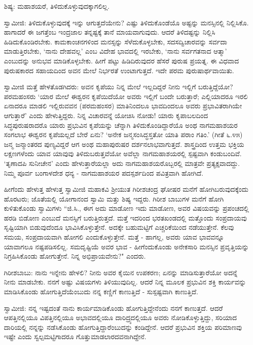 ಶಿಷ್ಯ: ಮಹಾಶಯರೆ, ತಿಳಿದುಕೊಳ್ಳುವುದಕ್ಕಾಗಲಿಲ್ಲ.

ಸ್ವಾಮೀಜಿ: ತಿಳಿದುಕೊಳ್ಳುವುದಕ್ಕೆ ಇನ್ನು ಆಗುತ್ತದೆಯೇನು? ಎಷ್ಟು ತಿಳಿದುಕೊಂಡೆಯೊ ಅಷ್ಟನ್ನು ಮನಸ್ಸಿನಲ್ಲಿ ನಿಲ್ಲಿಸಿಕೊ. ಹಾಗಾದರೆ ಈ ಜಗತ್ತೆಂಬ ಇಂದ್ರಜಾಲ ತನ್ನಷ್ಟಕ್ಕೆ ತಾನೆ ಮಾಯವಾಗುವುದು. ಆದರೆ ತಿಳಿದಷ್ಟನ್ನು ನಿಲ್ಲಿಸಿ ಹಿಡಿದುಕೊಂಡಿರಬೇಕು. ಕಾಮಕಾಂಚನಗಳಿಂದ ಮನಸ್ಸನ್ನು ಸೆಳೆದುಕೊಳ್ಳಬೇಕು, ಸದಸದ್ವಿಚಾರವನ್ನು ಸರ್ವದಾ ಮಾಡುತ್ತಿರಬೇಕು, ‘ನಾನು ದೇಹವಲ್ಲ’ ಎಂಬ ವಿದೇಹ ಭಾವದಲ್ಲಿ ಇರಬೇಕು, ‘ನಾನು ಸರ್ವಗತನಾದ ಆತ್ಮಾ’ ಎಂಬುದನ್ನು ಅನುಭವ ಮಾಡಿಕೊಳ್ಳಬೇಕು. ಹೀಗೆ ಪಟ್ಟು ಹಿಡಿದಿರುವುದರ ಹೆಸರೆ ಪುರುಷ ಪ್ರಯತ್ನ. ಈ ವಿಧವಾದ ಪುರುಷಕಾರದ ಸಹಾಯದಿಂದ ಅವನ ಮೇಲೆ ನಿರ್ಭರತೆ ಉಂಟಾಗುತ್ತದೆ. ಇದೇ ಪರಮ ಪುರುಷಾರ್ಥವಾಯಿತು.

ಸ್ವಾಮೀಜಿ ಮತ್ತೆ ಹೇಳತೊಡಗಿದರು: ಅವನ ಕೃಪೆಯು ನಿನ್ನ ಮೇಲೆ ಇಲ್ಲದಿದ್ದರೆ ನೀನು ಇಲ್ಲಿಗೆ ಬರುತ್ತಿದ್ದೆಯೋ? ಪರಮಹಂಸರು ‘ಯಾರ ಮೇಲೆ ಈಶ್ವರನ ಕೃಪೆಯಿದೆಯೋ ಅವರು ಇಲ್ಲಿಗೆ ಬಂದೇ ಬರುತ್ತಾರೆ; ಎಲ್ಲಿಯಾದರೂ ಇರಲಿ ಏನಾದರೂ ಮಾಡಲಿ ಇಲ್ಲಿರುವವನ (ಪರಮಹಂಸರ) ಮಾತಿನಿಂದಲೂ ಭಾವದಿಂದಲೂ ಅವರು ಪ್ರಭಾವಿತರಾಗಿಯೇ ಆಗುತ್ತಾರೆ’ ಎಂದು ಹೇಳುತ್ತಿದ್ದರು. ನಿನ್ನ ವಿಚಾರವನ್ನೆ ಯೋಚಿಸಿ ನೋಡು! ಯಾರು ಕೃಪಾಬಲದಿಂದ ಸಿದ್ಧಪುರುಷರಾದರೊ ಯಾರು ಪ್ರಭುವಿನ ಕೃಪೆಯನ್ನು ಚೆನ್ನಾಗಿ ತಿಳಿದುಕೊಂಡಿದ್ದಾರೆಯೊ ಅಂಥ ನಾಗಮಹಾಶಯರ ಸಂಗಲಾಭ ಈಶ್ವರನ ಕೃಪೆಯಲ್ಲದೆ ಬೇರೆ ಏನು? ‘ಅನೇಕ ಜನ್ಮಸಂಸಿದ್ಧಸ್ತತೋ ಯಾತಿ ಪರಾಂ ಗತಿಂ.’ (ಗೀತೆ ೬.೪೫) ಜನ್ಮ ಜನ್ಮಾಂತರದ ಪುಣ್ಯವಿದ್ದರೆ ಆಗ ಅಂಥ ಮಹಾಪುರುಷರ ದರ್ಶನಲಾಭವಾಗುತ್ತದೆ. ಶಾಸ್ತ್ರದಿಂದ ಉತ್ತಮ ಭಕ್ತಿಯ ಲಕ್ಷಣಗಳೆಂದು ಯಾವ ಯಾವುವು ತಿಳಿದುಬರುತ್ತವೆಯೋ ಅವೆಲ್ಲಾ ನಾಗಮಹಾಶಯರಲ್ಲಿ ಸ್ಪಷ್ಟವಾಗಿ ಕಂಡುಬಂದಿವೆ. ‘ತೃಣಾದಪಿ ಸುನೀಚೇನ’ ಎಂದು ಹೇಳುತ್ತಾರೆಯಲ್ಲಾ ಅದು ನಾಗಮಹಾಶಯರೊಬ್ಬರಲ್ಲಿ ಮಾತ್ರವೇ ಪ್ರತ್ಯಕ್ಷವಾದದ್ದು. ನಿಮ್ಮ ಪೂರ್ವ ಬಂಗಾಳದೇಶ ಧನ್ಯ - ನಾಗಮಹಾಶಯರ ಪದಸ್ಪರ್ಶದಿಂದ ಪವಿತ್ರವಾಗಿ ಹೋಗಿದೆ.

ಹೀಗೆಂದು ಹೇಳುತ್ತ ಹೇಳುತ್ತ ಸ್ವಾಮೀಜಿ ಮಹಾಕವಿ ಶ‍್ರೀಯುತ ಗಿರೀಶಚಂದ್ರ ಘೋಷರ ಮನೆಗೆ ಹೋಗಿಬರುವುದಕ್ಕೆಂದು ಹೊರಟರು; ಜೊತೆಯಲ್ಲಿ ಯೋಗಾನಂದ ಸ್ವಾಮಿ ಮತ್ತು ಶಿಷ್ಯ ಇದ್ದರು. ಗಿರೀಶ ಬಾಬುಗಳ ಮನೆಗೆ ಹೋಗಿ ಕುಳಿತುಕೊಂಡು ಸ್ವಾಮಿಗಳು “ಜಿ.ಸಿ., ಈಗ ಅದು ಮಾಡೋಣ ಇದು ಮಾಡೋಣ, ಅವರ ವಿಷಯವನ್ನು ಪ್ರಪಂಚದಲ್ಲಿ ಹರಡಿ ಬಿಡೋಣ ಎಂಬುದೆ ಮನಸ್ಸಿಗೆ ಬರುತ್ತಿರುತ್ತದೆ. ಮತ್ತೆ ಇದರಿಂದ ಭರತಖಂಡದಲ್ಲಿ ಮತ್ತೊಂದು ಸಂಪ್ರದಾಯವು ಸೃಷ್ಟಿಯಾಗಿ ಬಿಡುವುದೆಂದೂ ಭಾವಿಸಿಕೊಳ್ಳುತ್ತೇನೆ. ಅದಕ್ಕೇ ಬಹುಮಟ್ಟಿಗೆ ಎಚ್ಚರಿಕೆಯಿಂದ ನಡೆಯುತ್ತೇನೆ. ಕೆಲವು ಸಮಯ, ಸಂಪ್ರದಾಯವಾಗಿ ಹೋಗಲಿ ಎಂದುಕೊಳ್ಳುತ್ತೇನೆ. ಮತ್ತೆ - ಹಾಗಲ್ಲ, ಅವರು ಯಾವ ಭಾವವನ್ನೂ ಯಾವಾಗಲೂ ನಷ್ಟಪಡಿಸಲಿಲ್ಲ. ಸಮದೃಷ್ಟಿಯೆ ಅವರ ಭಾವ - ಹೀಗೆಂದುಕೊಂಡು ಅನೇಕಸಾರಿ ಮನಸ್ಸಿನ ಪ್ರವೃತ್ತಿಯನ್ನು ನಿಗ್ರಹಿಸಿಕೊಂಡು ಹೋಗುತ್ತೇನೆ. ನಿನ್ನ ಅಭಿಪ್ರಾಯವೇನು?" ಎಂದರು.

ಗಿರೀಶಬಾಬು: ನಾನು ಇನ್ನೇನು ಹೇಳಲಿ? ನೀನು ಅವರ ಕೈಯಿನ ಉಪಕರಣ; ಏನನ್ನು ಮಾಡಿಸುತ್ತಾರೆಯೋ ಅದನ್ನೆ ನೀನು ಮಾಡಬೇಕು. ನನಗೆ ಅಷ್ಟು ವಿಷಯಗಳು ತಿಳಿಯುವುದಿಲ್ಲ. ಆದರೆ ನಿನ್ನ ಮೂಲಕ ಪ್ರಭುವಿನ ಶಕ್ತಿ ಕಾರ್ಯವನ್ನು ಮಾಡಿಸಿಕೊಂಡು ಹೋಗುತ್ತಿದೆಯೆಂಬುದು ನನ್ನ ಕಣ್ಣಿಗೆ ಕಾಣುತ್ತಿದೆ - ಸುಸ್ಪಷ್ಟವಾಗಿ ಕಾಣುತ್ತಿದೆ.

ಸ್ವಾಮೀಜಿ: ನನ್ನ ಇಷ್ಟದಂತೆ ನಾನು ಕಾರ್ಯಮಾಡಿಕೊಂಡು ಹೋಗುತ್ತಿದ್ದೇನೆಂದು ನನಗೆ ಕಾಣುತ್ತದೆ. ಆದರೆ ಆಪತ್ತಿನಲ್ಲಿಯೂ ವಿಪತ್ತಿನಲ್ಲಿಯೂ ಅಭಾವದಲ್ಲಿಯೂ ದಾರಿದ್ರ್ಯದಲ್ಲಿಯೂ ಅವರು ನೋಡಿಕೊಳ್ಳುತ್ತಿದ್ದು, ಸರಿಯಾದ ದಾರಿಯಲ್ಲಿ ನನ್ನನ್ನು ನಡೆಸಿಕೊಂಡು ಹೋಗುತ್ತಿದ್ದಾರೆಂಬುದನ್ನು ಕಂಡಿದ್ದೇನೆ. ಆದರೆ ಪ್ರಭುವಿನ ಶಕ್ತಿಯ ಪರಿಮಾಣವು ಇಷ್ಟೇ ಎಂದು ಸ್ವಲ್ಪಮಟ್ಟಿಗಾದರೂ ಗೊತ್ತುಮಾಡಲಾರದವನಾಗಿದ್ದೇನೆ.

